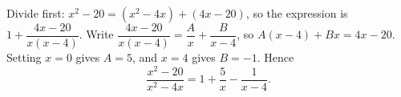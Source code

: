 Divide first: $x^2-20=(x^2-4x)+(4x-20)$, so the expression is $1+\dfrac{4x-20}{x(x-4)}$. Write $\dfrac{4x-20}{x(x-4)}=\dfrac {A}{x}+\dfrac{B}{x-4}$, so $A(x-4)+Bx=4x-20$. Setting $x=0$ gives $A=5$, and $x=4$ gives $B=-1$. Hence
\[
\dfrac{x^2-20}{x^2-4x}=\boxed{1+\dfrac{5}{x}-\dfrac{1}{x-4}}.
\]
